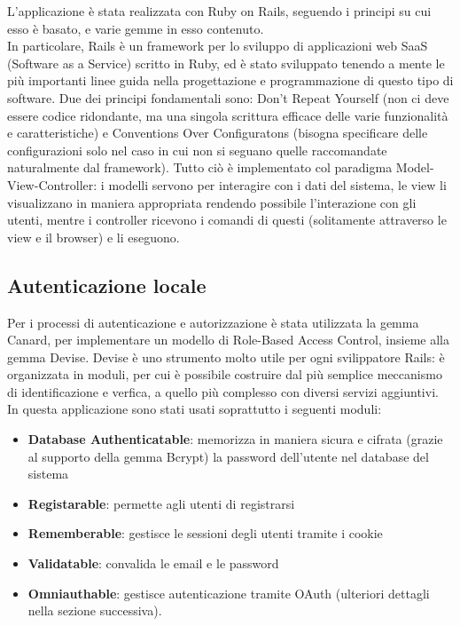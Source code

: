 \documentclass[Lau, binding=0.6cm, oneside]{sapthesis}
\begin{document}
L’applicazione è stata realizzata con Ruby on Rails, seguendo i principi su cui esso è basato, e varie gemme in esso contenuto.\\
In particolare, Rails è un framework per lo sviluppo di applicazioni web SaaS (Software as a Service) scritto in Ruby, ed è stato sviluppato tenendo a mente le più importanti linee guida nella progettazione e programmazione di questo tipo di software. Due dei principi fondamentali sono: Don’t Repeat Yourself (non ci deve essere codice ridondante, ma una singola scrittura efficace delle varie funzionalità e caratteristiche) e Conventions Over Configuratons (bisogna specificare delle configurazioni solo nel caso in cui non si seguano quelle raccomandate naturalmente dal framework).
Tutto ciò è implementato col paradigma Model-View-Controller: i modelli servono per interagire con i dati del sistema, le view li visualizzano in maniera appropriata rendendo possibile l’interazione con gli utenti, mentre i controller ricevono i comandi di questi (solitamente attraverso le view e il browser) e li eseguono.

\subsection{Autenticazione locale}

Per i processi di autenticazione e autorizzazione è stata utilizzata la gemma Canard, per implementare un modello di Role-Based Access Control, insieme alla gemma Devise.
Devise è uno strumento molto utile per ogni svilippatore Rails: è organizzata in moduli, per cui è possibile costruire dal più semplice meccanismo di identificazione e verfica, a quello più complesso con diversi servizi aggiuntivi. In questa applicazione sono stati usati soprattutto i seguenti moduli:

\begin{itemize}
	\item \textbf{Database Authenticatable}: memorizza in maniera sicura e cifrata (grazie al supporto della gemma Bcrypt) la password dell’utente nel database del sistema
	\item \textbf{Registarable}: permette agli utenti di registrarsi
	\item \textbf{Rememberable}: gestisce le sessioni degli utenti tramite i cookie
	\item \textbf{Validatable}: convalida le email e le password
	\item \textbf{Omniauthable}: gestisce autenticazione tramite OAuth (ulteriori dettagli nella sezione successiva).
\end{itemize}
\end{document}
